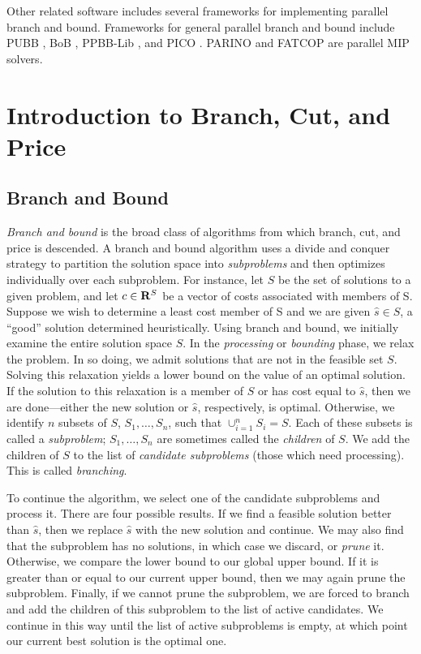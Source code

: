 Other related software includes several frameworks for implementing
parallel branch and bound. Frameworks for general parallel branch and
bound include PUBB \cite{PUBB}, BoB \cite{BoB}, PPBB-Lib
\cite{PPBB-Lib}, and PICO \cite{PICO}. PARINO \cite{PARINO} and FATCOP
\cite{FATCOP} are parallel MIP solvers.

\section{Introduction to Branch, Cut, and Price}
\label{B&C-intro}

\subsection{Branch and Bound}

{\em Branch and bound} is the broad class of algorithms from which
branch, cut, and price is descended. A branch and bound algorithm uses
a divide and conquer strategy to partition the solution space into
{\em subproblems} and then optimizes individually over each
subproblem. For instance, let $S$ be the set of solutions to a given
problem, and let $c \in {\bf R}^S$ be a vector of costs associated
with members of S. Suppose we wish to determine a least cost member of
S and we are given $\hat{s} \in S$, a ``good'' solution determined
heuristically. Using branch and bound, we initially examine the entire
solution space $S$. In the {\em processing} or {\em bounding} phase,
we relax the problem. In so doing, we admit solutions that are not in
the feasible set $S$. Solving this relaxation yields a lower bound on
the value of an optimal solution. If the solution to this relaxation
is a member of $S$ or has cost equal to $\hat{s}$, then we are
done---either the new solution or $\hat{s}$, respectively, is optimal.
Otherwise, we identify $n$ subsets of $S$, $S_1, \ldots, S_n$, such
that $\cup_{i = 1}^n S_i = S$. Each of these subsets is called a {\em
subproblem}; $S_1, \ldots, S_n$ are sometimes called the {\em
children} of $S$. We add the children of $S$ to the list of {\em
candidate subproblems} (those which need processing). This is called
{\em branching}.

To continue the algorithm, we select one of the candidate subproblems
and process it. There are four possible results. If we find a feasible
solution better than $\hat{s}$, then we replace $\hat{s}$ with the new
solution and continue. We may also find that the subproblem has no
solutions, in which case we discard, or {\em prune} it. Otherwise, we
compare the lower bound to our global upper bound. If it is greater
than or equal to our current upper bound, then we may again prune the
subproblem. Finally, if we cannot prune the subproblem, we are forced
to branch and add the children of this subproblem to the list of
active candidates. We continue in this way until the list of active
subproblems is empty, at which point our current best solution is the
optimal one.

